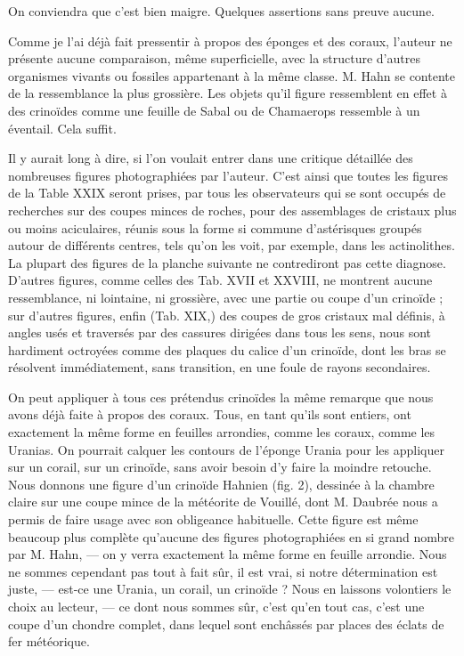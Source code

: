 \documentclass[a4paper, 12pt, oneside, french]{book}
\begin{document}
On conviendra que c'est bien maigre. Quelques assertions sans preuve aucune.

Comme je l'ai déjà fait pressentir à propos des éponges et des coraux, l'auteur ne présente aucune comparaison, même superficielle, avec la structure d'autres organismes vivants ou fossiles appartenant à la même classe. M. Hahn se contente de la ressemblance la plus grossière. Les objets qu'il figure ressemblent en effet à des crinoïdes comme une feuille de Sabal ou de Chamaerops ressemble à un éventail. Cela suffit.

Il y aurait long à dire, si l'on voulait entrer dans une critique détaillée des nombreuses figures photographiées par l'auteur. C'est ainsi que toutes les figures de la Table XXIX seront prises, par tous les observateurs qui se sont occupés de recherches sur des coupes minces de roches, pour des assemblages de cristaux plus ou moins aciculaires, réunis sous la forme si commune d'astérisques groupés autour de différents centres, tels qu'on les voit, par exemple, dans les actinolithes. La plupart des figures de la planche suivante ne contrediront pas cette diagnose. D'autres figures, comme celles des Tab. XVII et XXVIII, ne montrent aucune ressemblance, ni lointaine, ni grossière, avec une partie ou coupe d'un crinoïde ; sur d'autres figures, enfin (Tab. XIX,) des coupes de gros cristaux mal définis, à angles usés et traversés par des cassures dirigées dans tous les sens, nous sont hardiment octroyées comme des plaques du calice d'un crinoïde, dont les bras se résolvent immédiatement, sans transition, en une foule de rayons secondaires.

On peut appliquer à tous ces prétendus crinoïdes la même remarque que nous avons déjà faite à propos des coraux. Tous, en tant qu'ils sont entiers, ont exactement la même forme en feuilles arrondies, comme les coraux, comme les Uranias. On pourrait calquer les contours de l'éponge Urania pour les appliquer sur un corail, sur un crinoïde, sans avoir besoin d'y faire la moindre retouche. Nous donnons une figure d'un crinoïde Hahnien (fig. 2), dessinée à la chambre claire sur une coupe mince de la météorite de Vouillé, dont M. Daubrée nous a permis de faire usage avec son obligeance habituelle. Cette figure est même beaucoup plus complète qu'aucune des figures photographiées en si grand nombre par M. Hahn, --- on y verra exactement la même forme en feuille arrondie. Nous ne sommes cependant pas tout à fait sûr, il est vrai, si notre détermination est juste, --- est-ce une Urania, un corail, un crinoïde ? Nous en laissons volontiers le choix au lecteur, --- ce dont nous sommes sûr, c'est qu'en tout cas, c'est une coupe d'un chondre complet, dans lequel sont enchâssés par places des éclats de fer météorique.
\end{document}
